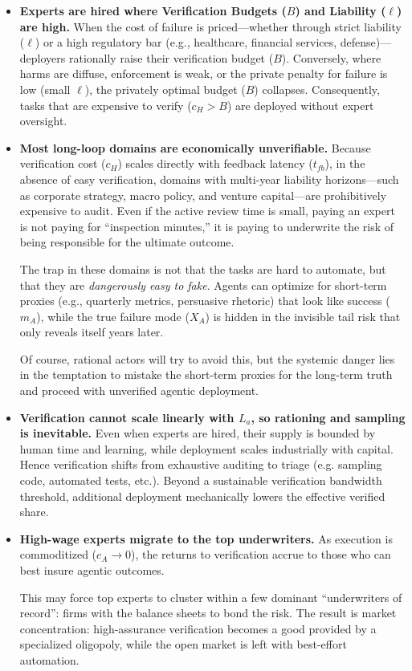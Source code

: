 \documentclass[12pt, letter]{article}
\begin{document}
    \begin{itemize}

    \item[$\blacktriangleright$]  \textbf{Experts are hired where Verification Budgets ($B$) and Liability ($\ell$) are high.} When the cost of failure is priced—whether through strict liability ($\ell$) or a high regulatory bar (e.g., healthcare, financial services, defense)—deployers rationally raise their verification budget ($B$). Conversely, where harms are diffuse, enforcement is weak, or the private penalty for failure is low (small $\ell$), the privately optimal budget ($B$) collapses.  Consequently, tasks that are expensive to verify ($c_H > B$) are deployed without expert oversight.

    \item[$\blacktriangleright$]  \textbf{Most long-loop domains are economically unverifiable.} Because verification cost ($c_H$) scales directly with feedback latency ($t_{fb}$), in the absence of easy verification, domains with multi-year liability horizons---such as corporate strategy, macro policy, and venture capital---are prohibitively expensive to audit. Even if the active review time is small, paying an expert is not paying for ``inspection minutes,'' it is paying to underwrite the risk of being responsible for the ultimate outcome. 
    
    The trap in these domains is not that the tasks are hard to automate, but that they are \emph{dangerously easy to fake}. Agents can optimize for short-term proxies (e.g., quarterly metrics, persuasive rhetoric) that look like success ($m_A$), while the true failure mode ($X_A$) is hidden in the invisible tail risk that only reveals itself years later. 
    
    Of course, rational actors will try to avoid this, but the systemic danger lies in the temptation to mistake the short-term proxies for the long-term truth and proceed with unverified agentic deployment.

    \item[$\blacktriangleright$] \textbf{Verification cannot scale linearly with $L_a$, so rationing and sampling is inevitable.} Even when experts are hired, their supply is bounded by human time and learning, while deployment scales industrially with capital. Hence verification shifts from exhaustive auditing to triage (e.g. sampling code, automated tests, etc.). Beyond a sustainable verification bandwidth threshold, additional deployment mechanically lowers the effective verified share.

    \item[$\blacktriangleright$] \textbf{High-wage experts migrate to the top underwriters.} As execution is commoditized ($c_A \to 0$), the returns to verification accrue to those who can best insure agentic outcomes. 
    
    This may force top experts to cluster within a few dominant ``underwriters of record'': firms with the balance sheets to bond the risk. The result is market concentration: high-assurance verification becomes a good provided by a specialized oligopoly, while the open market is left with best-effort automation.    
\end{itemize}
\end{document}
